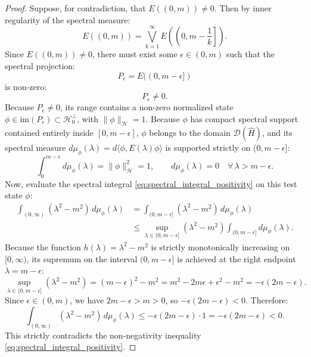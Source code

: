 \begin{proof}
Suppose, for contradiction, that $E((0, m)) \neq 0$. Then by inner regularity of the spectral measure:
\begin{equation}
E((0, m)) = \bigvee_{k=1}^\infty E\left( \left( 0, m - \frac{1}{k} \right] \right).
\end{equation}
Since $E((0, m)) \neq 0$, there must exist some $\epsilon \in (0, m)$ such that the spectral projection:
\begin{equation}
P_\epsilon = E((0, m - \epsilon])
\end{equation}
is non-zero:
\begin{equation}
P_\epsilon \neq 0.
\end{equation}
Because $P_\epsilon \neq 0$, its range contains a non-zero normalized state $\phi \in \mathrm{im}(P_\epsilon) \subset \mathcal{H}_0^\perp$, with $\|\phi\|_{\mathcal{H}} = 1$. Because $\phi$ has compact spectral support contained entirely inside $[0, m - \epsilon]$, $\phi$ belongs to the domain $\mathcal{D}(\hat{H})$, and its spectral measure $d\mu_\phi(\lambda) = d\langle \phi, E(\lambda) \phi \rangle$ is supported strictly on $(0, m - \epsilon]$:
\begin{equation}
\int_0^{m - \epsilon} d\mu_\phi(\lambda) = \|\phi\|_{\mathcal{H}}^2 = 1, \qquad d\mu_\phi(\lambda) = 0 \quad \forall \, \lambda > m - \epsilon.
\end{equation}
Now, evaluate the spectral integral \eqref{eq:spectral_integral_positivity} on this test state $\phi$:
\begin{align}
\int_{(0, \infty)} (\lambda^2 - m^2) \, d\mu_\phi(\lambda) &= \int_{(0, m - \epsilon]} (\lambda^2 - m^2) \, d\mu_\phi(\lambda) \nonumber \\
&\le \sup_{\lambda \in (0, m - \epsilon]} (\lambda^2 - m^2) \int_{(0, m - \epsilon]} d\mu_\phi(\lambda).
\end{align}
Because the function $h(\lambda) = \lambda^2 - m^2$ is strictly monotonically increasing on $[0, \infty)$, its supremum on the interval $(0, m - \epsilon]$ is achieved at the right endpoint $\lambda = m - \epsilon$:
\begin{equation}
\sup_{\lambda \in (0, m - \epsilon]} (\lambda^2 - m^2) = (m - \epsilon)^2 - m^2 = m^2 - 2m\epsilon + \epsilon^2 - m^2 = -\epsilon(2m - \epsilon).
\end{equation}
Since $\epsilon \in (0, m)$, we have $2m - \epsilon > m > 0$, so $-\epsilon(2m - \epsilon) < 0$. Therefore:
\begin{equation}
\int_{(0, \infty)} (\lambda^2 - m^2) \, d\mu_\phi(\lambda) \le -\epsilon(2m - \epsilon) \cdot 1 = -\epsilon(2m - \epsilon) < 0.
\end{equation}
This strictly contradicts the non-negativity inequality \eqref{eq:spectral_integral_positivity}.


\end{proof}

